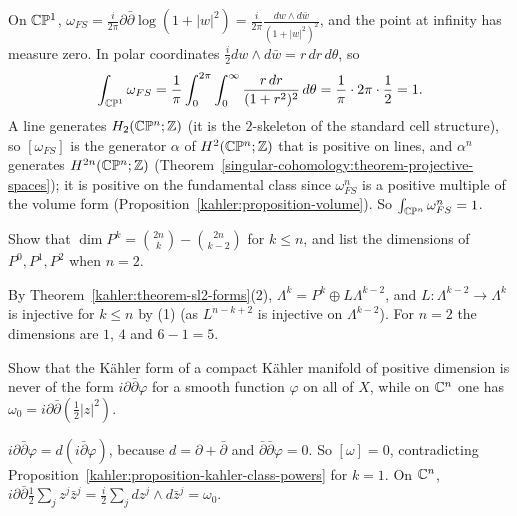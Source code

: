 \begin{solution}
On $\mathbb{C}\mathbb{P}^1$, $\omega_{FS} = \frac{i}{2\pi}\partial\bar\partial\log(1 + |w|^2) = \frac{i}{2\pi}\frac{dw \wedge d\bar w}{(1 + |w|^2)^2}$, and the
point at infinity has measure zero. In polar coordinates $\frac{i}{2}dw \wedge d\bar w = r\,dr\,d\theta$, so
\[
\int_{\mathbb{C}\mathbb{P}^1}\omega_{FS} = \frac1\pi\int_0^{2\pi}\int_0^\infty\frac{r\,dr}{(1 + r^2)^2}\,d\theta = \frac1\pi \cdot 2\pi \cdot \frac12 = 1 .
\]
A line generates $H_2(\mathbb{C}\mathbb{P}^n; \mathbb{Z})$ (it is the $2$-skeleton of the standard cell structure), so $[\omega_{FS}]$ is the generator $\alpha$
of $H^2(\mathbb{C}\mathbb{P}^n; \mathbb{Z})$ that is positive on lines, and
$\alpha^n$ generates $H^{2n}(\mathbb{C}\mathbb{P}^n; \mathbb{Z})$ (Theorem~\ref{singular-cohomology:theorem-projective-spaces}); it is positive on the
fundamental class since $\omega_{FS}^n$ is a positive multiple of the volume form (Proposition~\ref{kahler:proposition-volume}). So
$\int_{\mathbb{C}\mathbb{P}^n}\omega_{FS}^n = 1$.
\end{solution}

\begin{exercise}\label{kahler:exercise-primitive-dimension}
Show that $\dim P^k = \binom{2n}{k} - \binom{2n}{k-2}$ for $k \leq n$, and list the dimensions of $P^0, P^1, P^2$ when $n = 2$.
\end{exercise}

\begin{solution}
By Theorem~\ref{kahler:theorem-sl2-forms}(2), $\Lambda^k = P^k \oplus L\Lambda^{k-2}$, and $L \colon \Lambda^{k-2} \to \Lambda^k$ is injective
for $k \leq n$ by (1) (as $L^{n-k+2}$ is injective on $\Lambda^{k-2}$). For $n = 2$ the dimensions are $1$, $4$ and $6 - 1 = 5$.
\end{solution}

\begin{exercise}\label{kahler:exercise-no-global-potential}
Show that the K\"ahler form of a compact K\"ahler manifold of positive dimension is never of the form $i\partial\bar\partial\varphi$ for a
smooth function $\varphi$ on all of $X$, while on $\mathbb{C}^n$ one has $\omega_0 = i\partial\bar\partial(\frac12|z|^2)$.
\end{exercise}

\begin{solution}
$i\partial\bar\partial\varphi = d(i\bar\partial\varphi)$, because $d = \partial + \bar\partial$ and $\bar\partial\bar\partial\varphi = 0$. So
$[\omega] = 0$, contradicting Proposition~\ref{kahler:proposition-kahler-class-powers} for $k = 1$. On $\mathbb{C}^n$,
$i\partial\bar\partial\frac12\sum_jz^j\bar z^j = \frac{i}{2}\sum_jdz^j \wedge d\bar z^j = \omega_0$.
\end{solution}

